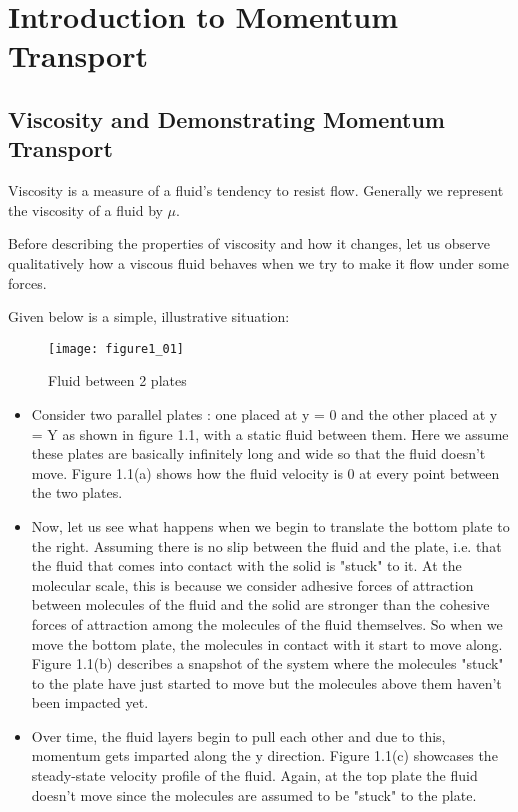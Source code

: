 \chapter{Introduction to Momentum Transport}

\section{Viscosity and Demonstrating Momentum Transport}

Viscosity is a measure of a fluid's tendency to resist flow. Generally we represent the viscosity of a fluid by $\mu$. 

Before describing the properties of viscosity and how it changes, let us observe qualitatively how a viscous fluid behaves when we try to make it flow under some forces.

Given below is a simple, illustrative situation:

\begin{figure}[h]
    \centering
    \texttt{[image: figure1\_01]}
    \caption{Fluid between 2 plates}
\end{figure}

\begin{itemize}
    \item Consider two parallel plates : one placed at y = 0 and the other placed at y = Y as shown in figure 1.1, with a static fluid between them. Here we assume these plates are basically infinitely long and wide so that the fluid doesn't move. Figure 1.1(a) shows how the fluid velocity is 0 at every point between the two plates. 

    \item Now, let us see what happens when we begin to translate the bottom plate to the right. Assuming there is no slip between the fluid and the plate, i.e. that the fluid that comes into contact with the solid is "stuck" to it. At the molecular scale, this is because we consider adhesive forces of attraction between molecules of the fluid and the solid are stronger than the cohesive forces of attraction among the molecules of the fluid themselves. So when we move the bottom plate, the molecules in contact with it start to move along. Figure 1.1(b) describes a snapshot of the system where the molecules "stuck" to the plate have just started to move but the molecules above them haven't been impacted yet.

    \item Over time, the fluid layers begin to pull each other and due to this, momentum gets imparted along the y direction. Figure 1.1(c) showcases the steady-state velocity profile of the fluid. Again, at the top plate the fluid doesn't move since the molecules are assumed to be "stuck" to the plate. 
\end{itemize}


